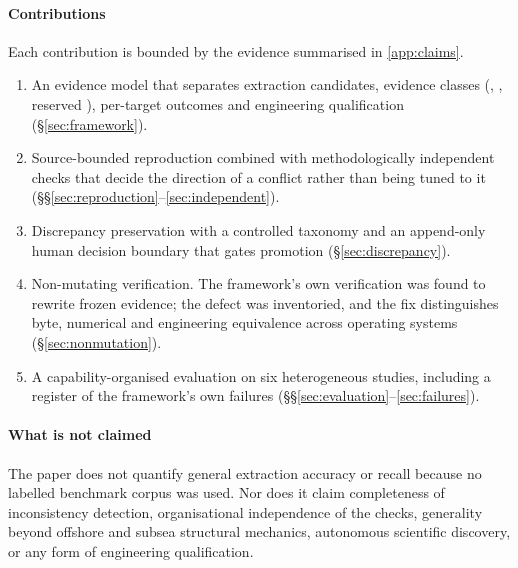 \paragraph{Contributions} Each contribution is bounded by the evidence summarised in \ref{app:claims}.
\begin{enumerate}[leftmargin=1.6em]
  \item An evidence model that separates extraction candidates, evidence classes (, , reserved ), per-target outcomes and engineering qualification (\S\ref{sec:framework}).
  \item Source-bounded reproduction combined with methodologically independent checks that decide the direction of a conflict rather than being tuned to it (\S\S\ref{sec:reproduction}--\ref{sec:independent}).
  \item Discrepancy preservation with a controlled taxonomy and an append-only human decision boundary that gates promotion (\S\ref{sec:discrepancy}).
  \item Non-mutating verification. The framework's own verification was found to rewrite frozen evidence; the defect was inventoried, and the fix distinguishes byte, numerical and engineering equivalence across operating systems (\S\ref{sec:nonmutation}).
  \item A capability-organised evaluation on six heterogeneous studies, including a register of the framework's own failures (\S\S\ref{sec:evaluation}--\ref{sec:failures}).
\end{enumerate}

\paragraph{What is not claimed} The paper does not quantify general extraction accuracy or recall because no labelled benchmark corpus was used. Nor does it claim completeness of inconsistency detection, organisational independence of the checks, generality beyond offshore and subsea structural mechanics, autonomous scientific discovery, or any form of engineering qualification.
